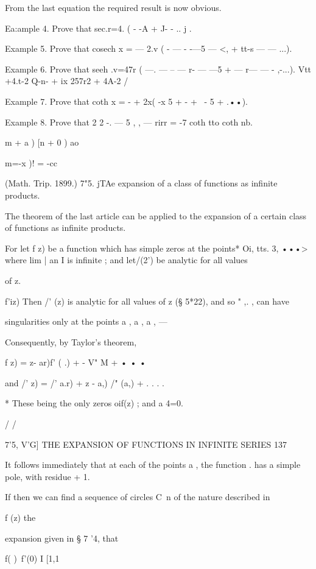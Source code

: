 From the last equation the required result is now obvious.

Ea:ample 4. Prove that sec.r=4. ( - -A + J- - .. j .

Example 5. Prove that cosech x = — 2.v ( - — - -—5 — <, + tt-s — —
...).

Example 6. Prove that seeh .v=47r ( —. — -- — r- — —5 + — r— — -
,-...). Vtt +4.t-2 Q-n- + ix 257r2 + 4A-2 /

Example 7. Prove that coth x = - + 2x( -x 5 + - + \ - 5 + .••).

Example 8. Prove that 2 2 -. — 5 , , — rirr = -7 coth tto coth nb.

 m + a ) [n + 0 ) ao



m=-x )! = -cc



(Math. Trip. 1899.) 7"5. jTAe expansion of a class of functions as
infinite products.

The theorem of the last article can be applied to the expansion of a
certain class of functions as infinite products.

For let f z) be a function which has simple zeros at the points* Oi,
tts. 3, •••> where lim | an I is infinite ; and let/(2') be analytic
for all values

of z.

f'iz) Then /' (z) is analytic for all values of z (§ 5*22), and so "
,. , can have

singularities only at the points a , a , a , —

Consequently, by Taylor's theorem,

f z) = z- ar)f' ( .) + - V" M + • • •

and /' z) = /' a.r) + z - a,) /" (a,) + . . . .

* These being the only zeros oif(z) ; and a 4=0.

/ /



7'5, V'G] THE EXPANSION OF FUNCTIONS IN INFINITE SERIES 137

It follows immediately that at each of the points a , the function .
has a simple pole, with residue + 1.

If then we can find a sequence of circles C\ n of the nature described
in

f (z) %
the

expansion given in § 7 '4, that

f( )\ f'(0) I [1,1



